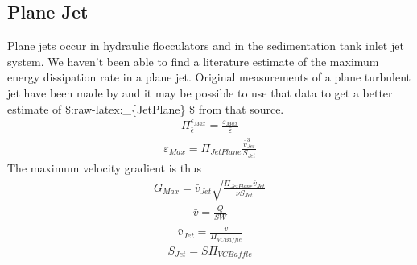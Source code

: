 \documentclass[letterpaper,10pt,english]{sphinxmanual}
\begin{document}
\subsection{Plane Jet}
\label{\detokenize{Rapid_Mix/RM_Derivations:plane-jet}}\label{\detokenize{Rapid_Mix/RM_Derivations:heading-plane-jet}}
Plane jets occur in hydraulic flocculators and in the sedimentation tank inlet jet system. We haven’t been able to find a literature estimate of the maximum energy dissipation rate in a plane jet. Original measurements of a plane turbulent jet have been made by  and it may be possible to use that data to get a better estimate of \$:raw-latex:\_\{JetPlane\} \$ from that source.
\begin{equation}\label{equation:Rapid_Mix/RM_Derivations:Rapid_Mix/RM_Derivations:121}
\begin{split}\Pi_{\bar \epsilon}^{\epsilon_{Max}} = \frac{\varepsilon_{Max}}{\bar \varepsilon}\end{split}
\end{equation}\begin{equation}\label{equation:Rapid_Mix/RM_Derivations:Rapid_Mix/RM_Derivations:122}
\begin{split}\varepsilon_{Max} = \Pi_{JetPlane}  \frac{  \bar v_{Jet} ^3}{S_{Jet}}\end{split}
\end{equation}
The maximum velocity gradient is thus
\begin{equation}\label{equation:Rapid_Mix/RM_Derivations:Rapid_Mix/RM_Derivations:123}
\begin{split}G_{Max} = \bar v_{Jet}\sqrt{\frac{\Pi_{JetPlane} \bar v_{Jet}}{\nu S_{Jet}}}\end{split}
\end{equation}\begin{equation}\label{equation:Rapid_Mix/RM_Derivations:Rapid_Mix/RM_Derivations:124}
\begin{split}\bar v = \frac{Q}{SW}\end{split}
\end{equation}\begin{equation}\label{equation:Rapid_Mix/RM_Derivations:Rapid_Mix/RM_Derivations:125}
\begin{split}\bar v_{Jet} = \frac{\bar v}{\Pi_{VCBaffle}}\end{split}
\end{equation}\begin{equation}\label{equation:Rapid_Mix/RM_Derivations:Rapid_Mix/RM_Derivations:126}
\begin{split}S_{Jet} = S \Pi_{VCBaffle}\end{split}
\end{equation}
\end{document}
